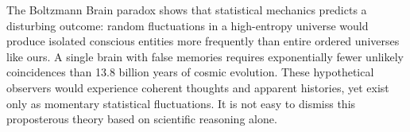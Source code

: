 The Boltzmann Brain paradox shows that statistical mechanics predicts a disturbing outcome: random fluctuations in a high-entropy universe would produce isolated conscious entities more frequently than entire ordered universes like ours. A single brain with false memories requires exponentially fewer unlikely coincidences than 13.8 billion years of cosmic evolution. These hypothetical observers would experience coherent thoughts and apparent histories, yet exist only as momentary statistical fluctuations. It is not easy to dismiss this proposterous theory based on scientific reasoning alone.
